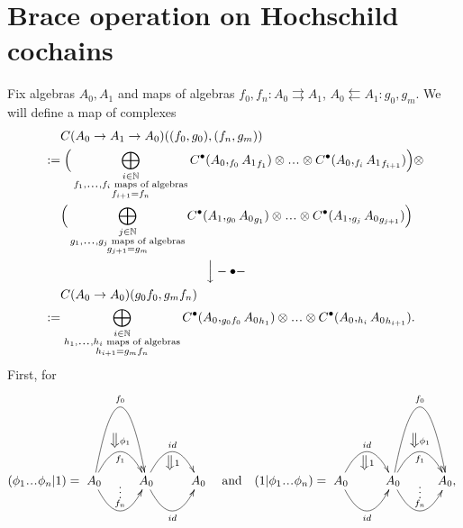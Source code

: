 


\section{Brace operation on Hochschild cochains}
\label{sec:def_braces}
Fix algebras $A_0, A_1$ and maps of algebras 
$f_0,f_n: A_0 \rightrightarrows A_1$, 
$A_0 \leftleftarrows A_1: g_0, g_m$. We will 
define a map of complexes 
\begin{align*}
&\phantom{{}={}}
C(A_0 \to A_1 \to A_0)((f_0,g_0), (f_n,g_m))\\
&:=
\Big( \bigoplus \limits_{\substack{
  i \in \mathbb{N}\\
  f_1,\smdots,f_i \textrm{ maps of algebras}\\
  f_{i+1} = f_n}}
  C^\bullet(A_0, _{f_0}{A_1}_{f_1}) \otimes \smdots \otimes 
  C^\bullet(A_0, _{f_i}{A_1}_{f_{i+1}}) \Big) \otimes \\
&\phantom{{}={}}  
\Big( \bigoplus \limits_{\substack{
	j \in \mathbb{N}\\
	g_1,\smdots,g_j \textrm{ maps of algebras}\\
	g_{j+1} = g_m}}
  C^\bullet(A_1, _{g_0}{A_0}_{g_1}) \otimes \smdots \otimes 
  C^\bullet(A_1, _{g_j}{A_0}_{g_{j+1}}) \Big)\\
&\phantom{{}moveovermoveovermoveover{}}
  \Big\downarrow -\bullet -\\
&\phantom{{}={}}
C(A_0 \to A_0)(g_0f_0, g_mf_n)\\
&:=
\bigoplus \limits_{\substack{
  i \in \mathbb{N}\\
  h_1,\smdots,h_i \textrm{ maps of algebras}\\
  h_{i+1} = g_mf_n}}
  C^\bullet(A_0, _{g_0f_0}{A_0}_{h_1}) \otimes \smdots \otimes 
  C^\bullet(A_0, _{h_i}{A_0}_{h_{i+1}}).
\end{align*}
First, for 
$$
(\phi_1\smdots\phi_n | 1) = 
\xymatrix{
A_0 
\ar@/^5pc/[r]^{f_0} 
\ar@/^2pc/[r]^{\big\Downarrow \phi_1}_{f_1} 
\ar@/_2pc/[r]^{\substack{\vdots\\ f_n}}
& A_0 
\ar@/^2pc/[r]^{}^{id}_{\big\Downarrow 1}
\ar@/_2pc/[r]_{id}
& A_0
}
\quad \textrm{and} \quad
(1|\phi_1\smdots\phi_n) = 
\xymatrix{
A_0
\ar@/^2pc/[r]^{}^{id}_{\big\Downarrow 1}
\ar@/_2pc/[r]_{id}
& A_0 
\ar@/^5pc/[r]^{f_0} 
\ar@/^2pc/[r]^{\big\Downarrow \phi_1}_{f_1} 
\ar@/_2pc/[r]^{\substack{\vdots\\ f_n}}
& A_0,
}$$
